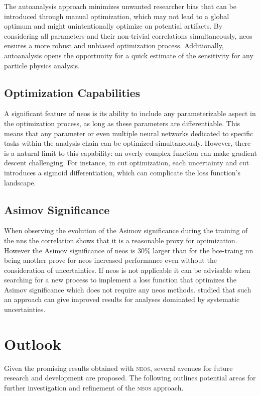 The autoanalysis approach minimizes unwanted researcher bias that can be introduced through manual optimization, which may not lead to a global optimum and might unintentionally optimize on potential artifacts. By considering all parameters and their non-trivial correlations simultaneously, \ac{neos} ensures a more robust and unbiased optimization process. Additionally, autoanalysis opens the opportunity for a quick estimate of the sensitivity for any particle physics analysis.

\subsection{Optimization Capabilities}
A significant feature of \ac{neos} is its ability to include any parameterizable aspect in the optimization process, as long as these parameters are differentiable. This means that any parameter or even multiple neural networks dedicated to specific tasks within the analysis chain can be optimized simultaneously. However, there is a natural limit to this capability: an overly complex function can make gradient descent challenging. For instance, in cut optimization, each uncertainty and cut introduces a sigmoid differentiation, which can complicate the loss function's landscape.

\subsection{Asimov Significance}
When observing the evolution of the Asimov significance during the training of the \acp{nn} the correlation shows that it is a reasonable proxy for optimization. However the Asimov significance of \ac{neos} is 30\% larger than for the \ac{bce}-traing \ac{nn} being another prove for \ac{neos} increased performance even without the consideration of uncertainties. If \ac{neos} is not applicable it can be advisable when searching for a new process to implement a loss function that optimizes the Asimov significance which does not require any \ac{neos} methods. \citet{elwood2018direct} studied that such an approach can give improved results for analyses dominated by systematic uncertainties.


\section{Outlook}
Given the promising results obtained with \textsc{neos}, several avenues for future research and development are proposed. The following outlines potential areas for further investigation and refinement of the \textsc{neos} approach.

